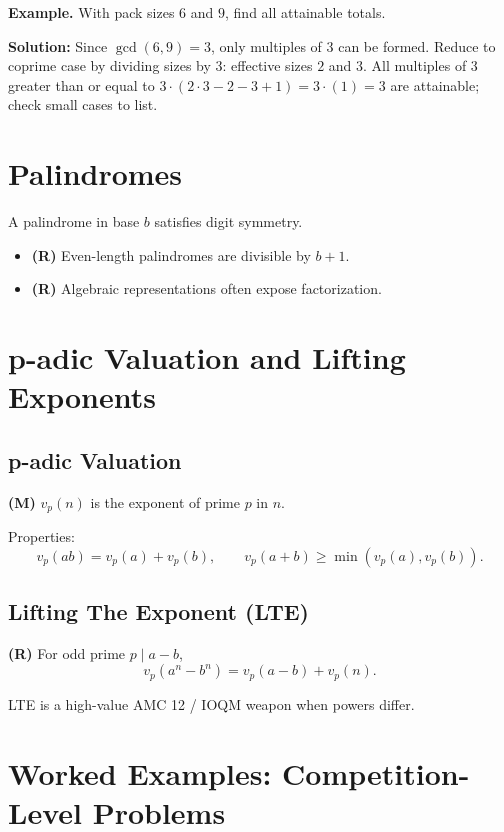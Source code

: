 \documentclass[12pt]{extarticle}
\begin{document}
\begin{examplebox}
\textbf{Example.} With pack sizes $6$ and $9$, find all attainable totals.
\end{examplebox}

	\textbf{Solution:} Since $\gcd(6,9)=3$, only multiples of $3$ can be formed. Reduce to coprime case by dividing sizes by $3$: effective sizes $2$ and $3$. All multiples of $3$ greater than or equal to $3\cdot(2\cdot3-2-3+1)=3\cdot(1)=3$ are attainable; check small cases to list.

\section{Palindromes}

A palindrome in base $b$ satisfies digit symmetry.

\begin{itemize}
\item \textbf{(R)} Even-length palindromes are divisible by $b+1$.
\item \textbf{(R)} Algebraic representations often expose factorization.
\end{itemize}

\section{p-adic Valuation and Lifting Exponents}

\subsection*{p-adic Valuation}
\textbf{(M)} $v_p(n)$ is the exponent of prime $p$ in $n$.

Properties:
\[
v_p(ab)=v_p(a)+v_p(b), \qquad
v_p(a+b)\ge \min(v_p(a),v_p(b)).
\]

\subsection*{Lifting The Exponent (LTE)}
\textbf{(R)} For odd prime $p\mid a-b$,
\[
v_p(a^n-b^n)=v_p(a-b)+v_p(n).
\]

LTE is a high-value AMC 12 / IOQM weapon when powers differ.

\newpage

\section{Worked Examples: Competition-Level Problems}
\end{document}
